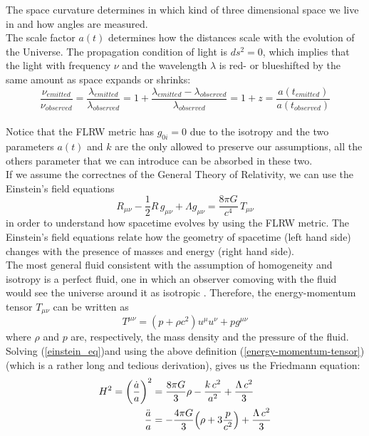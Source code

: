 \documentclass{article}
\begin{document}
The space curvature determines in which kind of three dimensional space we live in and how angles are measured.\\
The scale factor $a(t)$ determines how the distances scale with the evolution of the Universe.
The propagation condition of light is $ds^2 =0$, which implies that the light with frequency $\nu$ and the wavelength $\lambda$ is red- or blueshifted by the same amount as space expands or shrinks:
\begin{equation}
\dfrac{\nu_{emitted}}{\nu_{observed}} = \dfrac{\lambda_{emitted}}{\lambda_{observed}} = 1 + \dfrac{\lambda_{emitted}-\lambda_{observed}}{\lambda_{observed}}=1+z= \dfrac{a(t_{emitted})}{a(t_{observed})}
\end{equation}
\\
Notice that the FLRW metric has $g_{0 i}=0$ due to the isotropy and the two parameters $a(t)$ and $k$ are the only allowed to preserve our assumptions, all the others parameter that we can introduce can be absorbed in these two.
\\ %
If we assume the correctnes of the General Theory of Relativity, we can use the Einstein's field equations
\begin{equation}
\label{einstein_eq}
R_{\mu \nu} - \dfrac{1}{2} R \, g _{\mu \nu} + \Lambda g_{\mu \nu}= \dfrac{8 \pi G}{c^4} \, T_{\mu \nu}
\end{equation}
in order to understand how spacetime evolves by using the FLRW metric.
The Einstein's field equations relate how the geometry of spacetime (left hand side) changes with the presence of masses and energy (right hand side).\\
The most general fluid consistent with the assumption of homogeneity and isotropy is a perfect fluid, one in which an observer comoving with the fluid would see the universe around it as isotropic \citep{garcia-bellidoAstrophysicsCosmology2000}. Therefore, the energy-momentum tensor $T_{\mu \nu}$ can be written as
\begin{equation}
\label{energy-momentum-tensor}
T^{\mu \nu } = (p + \rho c^2)u ^{\mu} u^{\nu}+p g^{\mu \nu} 
\end{equation}
where $\rho$ and $p$ are, respectively, the mass density and the pressure of the fluid.\\
Solving (\ref{einstein_eq})and using the above definition (\ref{energy-momentum-tensor}) (which is a rather long and tedious derivation), gives us the Friedmann equation:
\begin{equation}
\label{firedmann_eq}
\begin{split}
H^2 = \qty(\frac{\dot{a}}{a})^2 &= \dfrac{8 \pi G}{3} \rho -\dfrac{k \, c^2}{a^2} + \frac{\Lambda \, c^2}{3} \\
\vspace{1.5cm}
\dfrac{\ddot{a}}{a} &= -\dfrac{4 \pi G}{3} \qty(\rho + 3 \dfrac{p}{c^2} ) +  \frac{\Lambda \, c^2}{3}
\end{split}
\end{equation}
\end{document}
